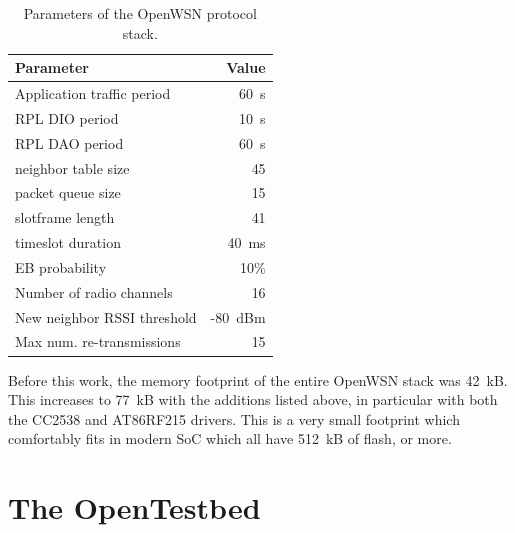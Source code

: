 \documentclass[sensors,article,submit,moreauthors,pdftex]{Definitions/mdpi}
\begin{document}
\begin{table}
\centering
    \begin{tabular}{|l|r|}
        \hline
        Parameter                           &   Value \\ \hline
        Application traffic period          &    60~s \\
        RPL DIO period                      &    10~s \\
        RPL DAO period                      &    60~s \\
        neighbor table size                 &      45 \\
        packet queue size                   &      15 \\
        slotframe length                    &      41 \\
        timeslot duration                   &   40~ms \\
        EB probability                      &    10\% \\
        Number of radio channels            &      16 \\
        New neighbor RSSI threshold         & -80~dBm \\
        Max num. re-transmissions           &      15 \\ \hline
    \end{tabular}
    \caption{Parameters of the OpenWSN protocol stack.}
    \label{tab:stack_params}
\end{table}


Before this work, the memory footprint of the entire OpenWSN stack was 42~kB.
This increases to 77~kB with the additions listed above, in particular with both the CC2538 and AT86RF215 drivers.
This is a very small footprint which comfortably fits in modern SoC which all have 512~kB of flash, or more.

\section{The OpenTestbed}
\label{sec:opentested}

\end{document}

